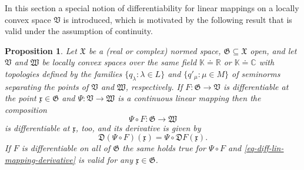 \documentclass[11pt,twoside,openright]{report}
\theoremstyle{definition}
\theoremstyle{plain}
\newtheorem{Pro}[Def]{Proposition}
\theoremstyle{remark}
\theoremstyle{assumption}
\newcommand{\bset}[1]{\bigl\{ #1 \bigr\}}
\newcommand{\ql}{q_\lambda}
\newcommand{\qprim}{q'_\mu}
\newcommand{\Cbb}{\mathbb{C}}
\newcommand{\Kbb}{\mathbb{K}}
\newcommand{\Rbb}{\mathbb{R}}
\newcommand{\Dfrak}{\mathfrak{D}}
\newcommand{\Gfrak}{\mathfrak{G}}
\newcommand{\Vfrak}{\mathfrak{V}}
\newcommand{\Wfrak}{\mathfrak{W}}
\newcommand{\Xfrak}{\mathfrak{X}}
\newcommand{\xfrak}{\mathfrak{x}}
\begin{document}
In this section a special notion of differentiability for linear
mappings on a locally convex space $\Vfrak$ is introduced, which is
motivated by the following result that is valid under the assumption
of continuity.
\begin{Pro}
  \label{Pro-differentiable-lin-mappings}
  Let $\Xfrak$ be a (real or complex) normed space, $\Gfrak \subseteq
  \Xfrak$ open, and let $\Vfrak$ and $\Wfrak$ be locally convex spaces
  over the same field $\Kbb \doteq \Rbb$ or $\Kbb \doteq \Cbb$ with
  topologies defined by the families $\bset{\ql : \lambda \in L}$  and
  $\bset{\qprim : \mu \in M}$ of seminorms separating the points of
  $\Vfrak$ and $\Wfrak$, respectively. If $F : \Gfrak \rightarrow
  \Vfrak$ is differentiable at the point $\xfrak \in \Gfrak$ and $\Psi
  : \Vfrak \rightarrow \Wfrak$ is a continuous linear mapping then the
  composition
  \begin{equation*}
    \Psi \circ F : \Gfrak \rightarrow \Wfrak
  \end{equation*}
  is differentiable at $\xfrak$, too, and its derivative is given by
  \begin{equation}
    \label{eq-diff-lin-mapping-derivative}
    \Dfrak ( \Psi \circ F ) ( \xfrak ) = \Psi \circ \Dfrak F ( \xfrak
    ) \text{.}
  \end{equation}
  If $F$ is differentiable on all of $\Gfrak$ the same holds true for
  $\Psi \circ F$ and \eqref{eq-diff-lin-mapping-derivative} is valid
  for any $\xfrak \in \Gfrak$.
\end{Pro}
\end{document}
